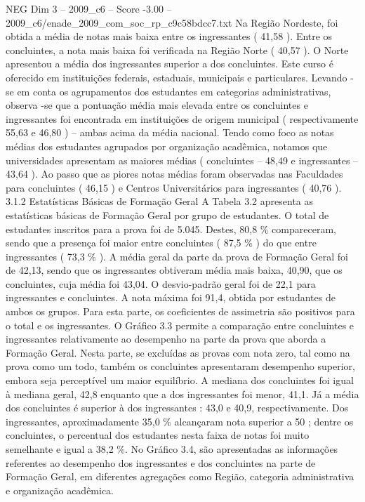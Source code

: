 \begin{textsample}{NEG Dim 3 – 2009\_c6 – Score -3.00 – 2009\_c6/enade\_2009\_com\_soc\_rp\_c9c58bdcc7.txt}
Na Região Nordeste, foi obtida a média de notas mais baixa entre os ingressantes ( 41,58 ).
Entre os concluintes, a nota mais baixa foi verificada na Região Norte ( 40,57 ).
O Norte apresentou a média dos ingressantes superior a dos concluintes.
Este curso é oferecido em instituições federais, estaduais, municipais e particulares.
Levando -se em conta os agrupamentos dos estudantes em categorias administrativas, observa -se que a pontuação média mais elevada entre os concluintes e ingressantes foi encontrada em instituições de origem municipal ( respectivamente 55,63 e 46,80 ) – ambas acima da média nacional.
Tendo como foco as notas médias dos estudantes agrupados por organização acadêmica, notamos que universidades apresentam as maiores médias ( concluintes – 48,49 e ingressantes – 43,64 ).
Ao passo que as piores notas médias foram observadas nas Faculdades para concluintes ( 46,15 ) e Centros Universitários para ingressantes ( 40,76 ). 3.1.2 Estatísticas Básicas de Formação Geral A Tabela 3.2 apresenta as estatísticas básicas de Formação Geral por grupo de estudantes.
O total de estudantes inscritos para a prova foi de 5.045.
Destes, 80,8 \% compareceram, sendo que a presença foi maior entre concluintes ( 87,5 \% ) do que entre ingressantes ( 73,3 \% ).
A média geral da parte da prova de Formação Geral foi de 42,13, sendo que os ingressantes obtiveram média mais baixa, 40,90, que os concluintes, cuja média foi 43,04.
O desvio-padrão geral foi de 22,1 para ingressantes e concluintes.
A nota máxima foi 91,4, obtida por estudantes de ambos os grupos.
Para esta parte, os coeficientes de assimetria são positivos para o total e os ingressantes.
O Gráfico 3.3 permite a comparação entre concluintes e ingressantes relativamente ao desempenho na parte da prova que aborda a Formação Geral.
Nesta parte, se excluídas as provas com nota zero, tal como na prova como um todo, também os concluintes apresentaram desempenho superior, embora seja perceptível um maior equilíbrio.
A mediana dos concluintes foi igual à mediana geral, 42,8 enquanto que a dos ingressantes foi menor, 41,1.
Já a média dos concluintes é superior à dos ingressantes : 43,0 e 40,9, respectivamente.
Dos ingressantes, aproximadamente 35,0 \% alcançaram nota superior a 50 ; dentre os concluintes, o percentual dos estudantes nesta faixa de notas foi muito semelhante e igual a 38,2 \%.
No Gráfico 3.4, são apresentadas as informações referentes ao desempenho dos ingressantes e dos concluintes na parte de Formação Geral, em diferentes agregações como Região, categoria administrativa e organização acadêmica.

\end{textsample}
